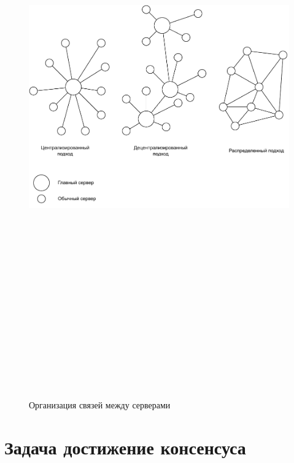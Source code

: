         \begin{figure}
            \centering
            \includegraphics[width=\textwidth*8/10,height=25cm,keepaspectratio]{inc/img/cen-dec-dis.pdf}
            \caption{Организация связей между серверами} \label{fig:cen_dec_dis}
        \end{figure}
        
    \section{Задача достижение консенсуса}

